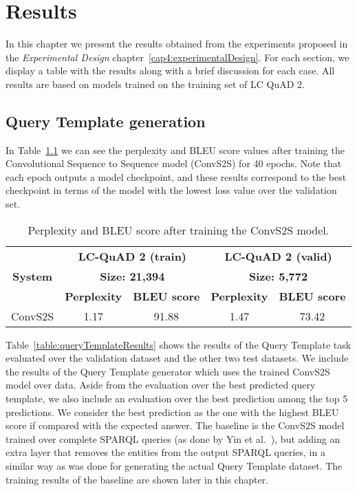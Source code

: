 \chapter{Results}
\label{cap5:results}
In this chapter we present the results obtained from the experiments proposed in the 
\textit{Experimental Design} chapter~\ref{cap4:experimentalDesign}. For each section, we 
display a table with the results 
along with a brief discussion for each case. All results are based on models trained on the 
training set of LC QuAD 2.

\section{Query Template generation}
\label{cap5:results/queryTemplate}
In Table~\ref{table:queryTemplateTraining} we can see the perplexity and BLEU score values after 
training the Convolutional Sequence to Sequence model (ConvS2S) for 40 epochs. Note that each 
epoch outputs a model checkpoint, and these results correspond to the best checkpoint in terms 
of the model with the lowest loss value over the validation set.

\begin{table}[h!]
    \centering
    \begin{tabular}{|c|cc|cc|}
        \hline
        \multirow{3}{*}{\textbf{System}} & \multicolumn{2}{c|}{\textbf{LC-QuAD 2 (train)}}       & \multicolumn{2}{c|}{\textbf{LC-QuAD 2 (valid)}}       \\ \cline{2-5} 
                                & \multicolumn{2}{c|}{\textbf{Size: 21,394}}            & \multicolumn{2}{c|}{\textbf{Size: 5,772}}             \\ \cline{2-5} 
                                & \multicolumn{1}{c|}{\textbf{Perplexity}} & \textbf{BLEU score} & \multicolumn{1}{c|}{\textbf{Perplexity}} & \textbf{BLEU score} \\ \hline
        ConvS2S                 & 1.17                            & 91.88      & 1.47                            & 73.42      \\ \hline
    \end{tabular}
    \caption{Perplexity and BLEU score after training the ConvS2S model.}
    \label{table:queryTemplateTraining}
\end{table}

Table~\ref{table:queryTemplateResults} shows the results of the Query Template task evaluated 
over the \LCQuADtwo{} validation dataset and the other two test datasets. We include the results of 
the Query Template generator which uses the trained ConvS2S model over \LCQuADtwo{} data. Aside 
from the evaluation over the best predicted query template, we also include an evaluation over 
the best prediction among the top 5 predictions. We consider the best prediction as the one with 
the highest BLEU score if compared with the expected answer. The baseline is the ConvS2S model 
trained over complete SPARQL queries (as done by Yin et al.~\cite{nmt:nl-to-sparql-Yin19}), but 
adding an extra layer that removes the entities from the output SPARQL queries, in a similar way 
as was done for generating the actual \LCQuADtwo{} Query Template dataset. The training results of 
the baseline are shown later in this chapter.

